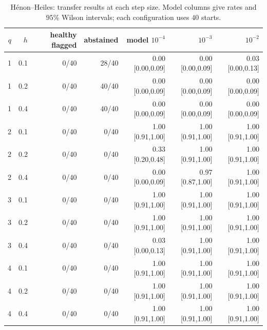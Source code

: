 \begin{table}[ht]
\centering\small
\begin{tabular}{rrrrrrr}
\toprule
$q$ & $h$ & healthy flagged & abstained & model $10^{-4}$ & $10^{-3}$ & $10^{-2}$ \\
\midrule
1 & 0.1 & 0/40 & 28/40 & 0.00 [0.00,0.09] & 0.00 [0.00,0.09] & 0.03 [0.00,0.13] \\
1 & 0.2 & 0/40 & 40/40 & 0.00 [0.00,0.09] & 0.00 [0.00,0.09] & 0.00 [0.00,0.09] \\
1 & 0.4 & 0/40 & 40/40 & 0.00 [0.00,0.09] & 0.00 [0.00,0.09] & 0.00 [0.00,0.09] \\
2 & 0.1 & 0/40 & 0/40 & 1.00 [0.91,1.00] & 1.00 [0.91,1.00] & 1.00 [0.91,1.00] \\
2 & 0.2 & 0/40 & 0/40 & 0.33 [0.20,0.48] & 1.00 [0.91,1.00] & 1.00 [0.91,1.00] \\
2 & 0.4 & 0/40 & 0/40 & 0.00 [0.00,0.09] & 0.97 [0.87,1.00] & 1.00 [0.91,1.00] \\
3 & 0.1 & 0/40 & 0/40 & 1.00 [0.91,1.00] & 1.00 [0.91,1.00] & 1.00 [0.91,1.00] \\
3 & 0.2 & 0/40 & 0/40 & 1.00 [0.91,1.00] & 1.00 [0.91,1.00] & 1.00 [0.91,1.00] \\
3 & 0.4 & 0/40 & 0/40 & 0.03 [0.00,0.13] & 1.00 [0.91,1.00] & 1.00 [0.91,1.00] \\
4 & 0.1 & 0/40 & 0/40 & 1.00 [0.91,1.00] & 1.00 [0.91,1.00] & 1.00 [0.91,1.00] \\
4 & 0.2 & 0/40 & 0/40 & 1.00 [0.91,1.00] & 1.00 [0.91,1.00] & 1.00 [0.91,1.00] \\
4 & 0.4 & 0/40 & 0/40 & 1.00 [0.91,1.00] & 1.00 [0.91,1.00] & 1.00 [0.91,1.00] \\
\bottomrule
\end{tabular}
\caption{H\'enon--Heiles: transfer results at each step size. Model columns give rates and $95\%$ Wilson intervals; each configuration uses $40$ starts.}
\end{table}
